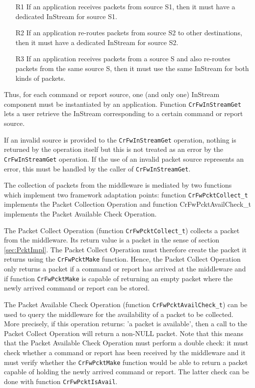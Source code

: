 \documentclass{pnp_article}
\begin{document}
\begin{itemize}
\item[R1]{If an application receives packets from source S1, then it must have a dedicated InStream for source S1.}
\item[R2]{If an application re-routes packets from source S2 to other destinations, then it must have a dedicated InStream for source S2.}
\item[R3]{If an application receives packets from a source S and also re-routes packets from the same source S, then it must use the same InStream for both kinds of packets.}
\end{itemize}

Thus, for each command or report source, one (and only one) InStream component must be instantiated by an application. Function \texttt{CrFwInStreamGet} lets a user retrieve the InStream corresponding to a certain command or report source. 

If an invalid source is provided to the \texttt{CrFwInStreamGet} operation, nothing is returned by the operation itself but this is not treated as an error by the \texttt{CrFwInStreamGet} operation. If the use of an invalid packet source represents an error, this must be handled by the caller of \texttt{CrFwInStreamGet}.

The collection of packets from the middleware is mediated by two functions which implement two framework adaptation points: function \texttt{CrFwPcktCollect\_t} implements the Packet Collection Operation and function CrFwPcktAvailCheck\_t implements the Packet Available Check Operation. 

The Packet Collect Operation (function \texttt{CrFwPcktCollect\_t}) collects a packet from the middleware. Its return value is a packet in the sense of section \ref{sec:PcktImpl}. The Packet Collect Operation must therefore create the packet it returns using the \texttt{CrFwPcktMake} function. Hence, the Packet Collect Operation only returns a packet if a command or report has arrived at the middleware and if function \texttt{CrFwPcktMake} is capable of returning an empty packet where the newly arrived command or report can be stored. 

The Packet Available Check Operation (function \texttt{CrFwPcktAvailCheck\_t}) can be used to query the middleware for the availability of a packet to be collected. More precisely, if this operation returns: 'a packet is available', then a call to the Packet Collect Operation will return a non-NULL packet. Note that this means that the Packet Available Check Operation must perform a double check: it must check whether a command or report has been received by the middleware and it must verify whether the \texttt{CrFwPcktMake} function would be able to return a packet capable of holding the newly arrived command or report. The latter check can be done with function \texttt{CrFwPcktIsAvail}.
\end{document}
